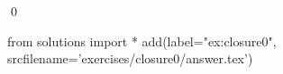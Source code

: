 \begin{ex} 
  \label{ex:closure0}
  
  \qed
\end{ex} 
\begin{python0}
from solutions import *
add(label="ex:closure0",
    srcfilename='exercises/closure0/answer.tex') 
\end{python0}

